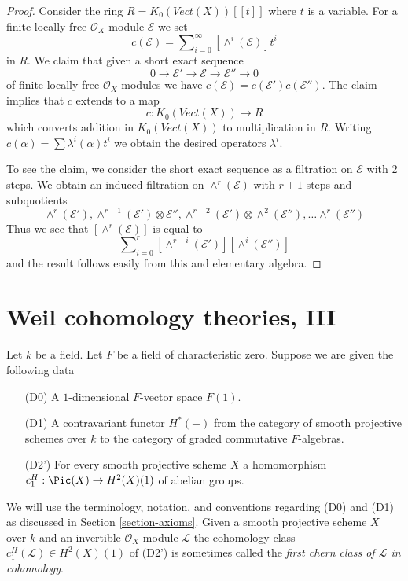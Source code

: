 \begin{proof}
Consider the ring $R = K_0(\textit{Vect}(X))[[t]]$ where $t$ is a
variable. For a finite locally free $\mathcal{O}_X$-module
$\mathcal{E}$ we set
$$
c(\mathcal{E}) = \sum\nolimits_{i = 0}^\infty [\wedge^i(\mathcal{E})] t^i
$$
in $R$. We claim that given a short exact sequence
$$
0 \to \mathcal{E}' \to \mathcal{E} \to \mathcal{E}'' \to 0
$$
of finite locally free $\mathcal{O}_X$-modules
we have $c(\mathcal{E}) = c(\mathcal{E}') c(\mathcal{E}'')$.
The claim implies that $c$ extends to a map
$$
c :  K_0(\textit{Vect}(X)) \longrightarrow R
$$
which converts addition in $K_0(\textit{Vect}(X))$ to multiplication in $R$.
Writing $c(\alpha) = \sum \lambda^i(\alpha) t^i$ we obtain the desired
operators $\lambda^i$.

\medskip\noindent
To see the claim, we consider the short exact sequence as a
filtration on $\mathcal{E}$ with $2$ steps. We obtain an induced
filtration on $\wedge^r(\mathcal{E})$ with $r + 1$ steps and
subquotients
$$
\wedge^r(\mathcal{E}'),
\wedge^{r - 1}(\mathcal{E}') \otimes \mathcal{E}'',
\wedge^{r - 2}(\mathcal{E}') \otimes \wedge^2(\mathcal{E}''), \ldots
\wedge^r(\mathcal{E}'')
$$
Thus we see that $[\wedge^r(\mathcal{E})]$ is equal to
$$
\sum\nolimits_{i = 0}^r
[\wedge^{r - i}(\mathcal{E}')] [\wedge^i(\mathcal{E}'')]
$$
and the result follows easily from this and elementary algebra.
\end{proof}










\section{Weil cohomology theories, III}
\label{section-c1}

\noindent
Let $k$ be a field. Let $F$ be a field of characteristic zero.
Suppose we are given the following data
\begin{enumerate}
\item[(D0)] A $1$-dimensional $F$-vector space $F(1)$.
\item[(D1)] A contravariant functor $H^*(-)$ from the category of smooth
projective schemes over $k$ to the category of graded commutative
$F$-algebras.
\item[(D2')] For every smooth projective scheme $X$ a homomorphism
$c_1^H : \Pic(X) \to H^2(X)(1)$ of abelian groups.
\end{enumerate}
We will use the terminology, notation, and conventions regarding
(D0) and (D1) as discussed in Section \ref{section-axioms}.
Given a smooth projective scheme $X$ over $k$ and an invertible
$\mathcal{O}_X$-module $\mathcal{L}$ the cohomology class
$c_1^H(\mathcal{L}) \in H^2(X)(1)$ of (D2')
is sometimes called the {\it first chern class of $\mathcal{L}$
in cohomology}.

